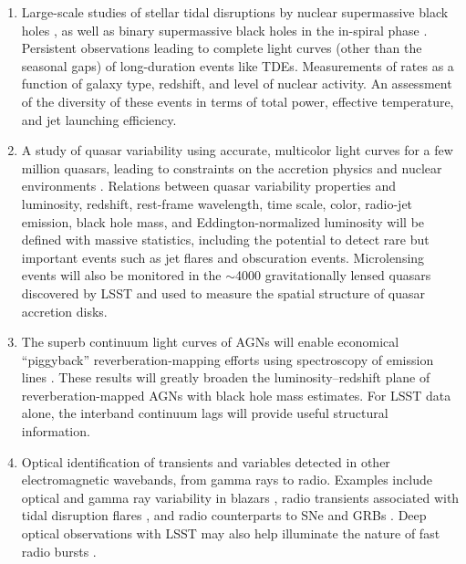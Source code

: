 \begin{enumerate}
\item Large-scale studies of stellar tidal disruptions by nuclear supermassive
  black holes \cite[e.g.,][]{1989ApJ...346L..13E,2008ApJ...676..944G,2009MNRAS.400.2070S,2011Sci...333..203B,2012EPJWC..3903001G,2015JHEAp...7..148K}, as well as binary
  supermassive black holes in the in-spiral phase \cite[e.g.,][]{2009MNRAS.393.1423C,2017MNRAS.465.3840C}.
  Persistent observations leading to complete light curves (other than
  the seasonal gaps) of long-duration events like
  TDEs. Measurements of rates as a function of galaxy type, redshift,
  and level of nuclear activity. An assessment of the diversity
  of these events in terms of total power, effective temperature, and
  jet launching efficiency.


\item A study of quasar variability using accurate, multicolor light
  curves for a few million
quasars, leading to constraints on the accretion physics and nuclear environments \citep{2003AJ....126.1217D,2004ApJ...601..692V,2010ApJ...721.1014M,2017ApJ...836..186J}.
      Relations between quasar variability
      properties and luminosity, redshift,
      rest-frame wavelength, time scale, color, radio-jet emission, black hole
      mass, and Eddington-normalized luminosity will be defined with massive
      statistics, including the potential to detect rare but important events such as
      jet flares and obscuration events. Microlensing events will also be monitored in the $\sim$4000 gravitationally lensed
      quasars discovered by LSST and used to measure the spatial structure of quasar accretion disks.

\item The superb continuum light curves of AGNs will enable economical ``piggyback''
      reverberation-mapping efforts using spectroscopy of emission lines
      \cite[e.g.,][]{2012ApJ...747...62C,2015ApJS..216....4S,2017ApJ...851...21G}. These results
      will greatly broaden the luminosity--redshift plane of reverberation-mapped AGNs
      with black hole mass estimates. For LSST data alone, the interband continuum lags
      will provide useful structural information.

\item Optical identification of transients and variables detected in
  other electromagnetic wavebands, from gamma rays to radio. Examples
  include optical and gamma ray variability in blazars \citep{2014MNRAS.439..690H},
  radio transients associated with tidal disruption flares
  \citep{2011MNRAS.416.2102G}, and radio counterparts to SNe and
  GRBs \citep{2006ApJ...639..331G}. Deep optical observations with LSST may
  also help illuminate the nature of fast radio bursts \cite[FRBs;][]{2007Sci...318..777L,2013Sci...341...53T}.


\end{enumerate}
